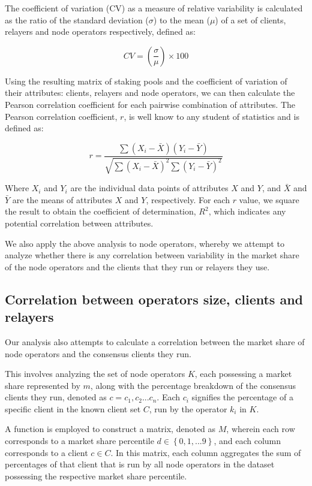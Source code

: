 \documentclass[conference]{IEEEtran}
\begin{document}
The coefficient of variation (CV) as a measure of relative variability is calculated as the ratio of the standard deviation ($\sigma$) to the mean ($\mu$) of a set of clients, relayers and node operators respectively, defined as:

\[ CV = \left( \frac{\sigma}{\mu} \right) \times 100 \]

Using the resulting matrix of staking pools and the coefficient of variation of their attributes: clients, relayers and node operators, we can then calculate the Pearson correlation coefficient \cite{pearson1895} for each pairwise combination of attributes.  The Pearson correlation coefficient, $r$, is well know to any student of statistics and is defined as:

\[
r = \frac{\sum{(X_i - \bar{X})(Y_i - \bar{Y})}}{\sqrt{\sum{(X_i - \bar{X})^2}\sum{(Y_i - \bar{Y})^2}}}
\]

\vspace{3pt}

Where $X_i$ and $Y_i$ are the individual data points of attributes $X$ and $Y$, and $\bar{X}$ and $\bar{Y}$ are the means of attributes $X$ and $Y$, respectively.  For each $r$ value, we square the result to obtain the coefficient of determination, $R^2$, which indicates any potential correlation between attributes.

We also apply the above analysis to node operators, whereby we attempt to analyze whether there is any correlation between variability in the market share of the node operators and the clients that they run or relayers they use.

\subsection{Correlation between operators size, clients and relayers}
\label{sec:correlation-between-operators-size-clients-and-relayers}

Our analysis also attempts to calculate a correlation between the market share of node operators and the consensus clients they run.

This  involves analyzing the set of node operators $K$, each possessing a market share represented by $m$, along with the percentage breakdown of the consensus clients they run, denoted as $c = { c_1, c_2 . . . c_n }$. Each $c_i$ signifies the percentage of a specific client in the known client set $C$, run by the operator $k_i$ in $K$.

A function is employed to construct a matrix, denoted as $M$, wherein each row corresponds to a market share percentile $d \in \left\{0, 1, ... 9\right\}$, and each column corresponds to a client $c \in C$. In this matrix, each column aggregates the sum of percentages of that client that is run by all node operators in the dataset possessing the respective market share percentile.
\end{document}

